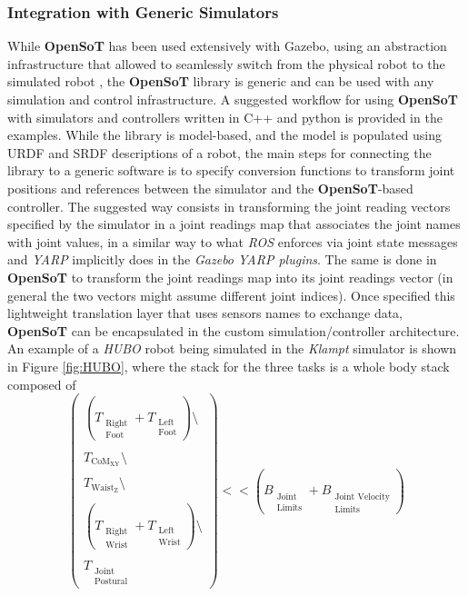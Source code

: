 \subsubsection{Integration with Generic Simulators}
While \textbf{OpenSoT} has been used extensively with Gazebo, using an abstraction infrastructure that allowed to seamlessly switch from the physical robot to the simulated robot \cite{hoffman2014yarp}, the \textbf{OpenSoT} library is generic and can be used with any simulation and control infrastructure.
A suggested workflow for using \textbf{OpenSoT} with simulators and controllers written in C++ and python is provided in the examples. While the library  is model-based, and the model is populated using URDF and SRDF descriptions of a robot, the main steps for connecting the library to a generic software is to specify conversion functions to transform joint positions and references between the simulator and the \textbf{OpenSoT}-based controller.
The suggested way consists in transforming the joint reading vectors specified by the simulator in a joint readings map that associates the joint names with joint values, in a similar way to what \emph{ROS} enforces via joint state messages and \emph{YARP} implicitly does in the \emph{Gazebo YARP plugins}. The same is done in \textbf{OpenSoT} to transform the joint readings map into its joint readings vector (in general the two vectors might assume different joint indices). Once specified this lightweight translation layer that uses sensors names to exchange data, \textbf{OpenSoT} can be encapsulated in the custom simulation/controller architecture. An example of a \emph{HUBO} robot being simulated in the \emph{Klampt} simulator is shown in Figure \ref{fig:HUBO}, where the stack for the three tasks is a whole body stack composed of
\begin{equation}
\begin{pmatrix}

\left(T_{\substack{\text{Right}\\\text{Foot}}} + T_{\substack{\text{Left}\\\text{Foot}}}\right)\setminus\\
\\
T_{\text{CoM}_\text{XY}}\setminus\\
\\
T_{\text{Waist}_\text{Z}}\setminus\\
\\
\left(T_{\substack{\text{Right}\\\text{Wrist}}} + T_{\substack{\text{Left}\\\text{Wrist}}}\right)\setminus\\
\\
T_{\substack{\text{Joint}\\\text{Postural}}}

\end{pmatrix}
<< \left(B_{\substack{\text{Joint}\\\text{Limits}}} + B_{\substack{\text{Joint Velocity}\\\text{Limits}}}\right)
\end{equation}
